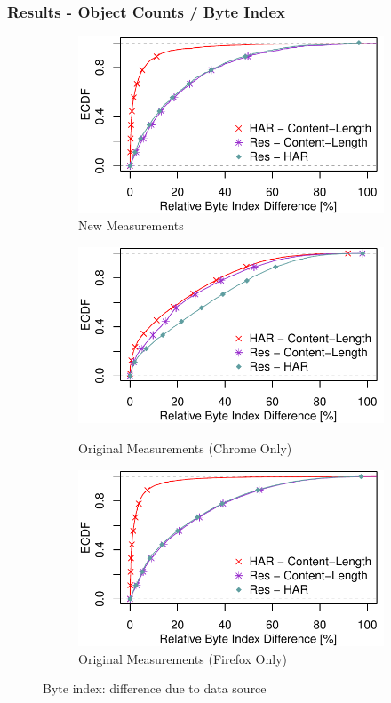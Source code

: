 \begin{frame}
    \frametitle{Results - Object Counts / Byte Index}
\begin{figure}
 \centering
 \begin{subfigure}{0.5\textwidth}
 \centering
 	 \includegraphics[width=\linewidth,keepaspectratio]{New_Plots/ecdf_rel_object_byte_index.pdf}
	\caption{New Measurements}
	\label{fig:new_relative_byte_index}

	\end{subfigure}%
	 \begin{subfigure}{0.5\textwidth}
	 \centering
	\includegraphics[width=.8\linewidth,keepaspectratio]{Chrome_Plots/ecdf_rel_object_byte_index.pdf}
	\caption{Original Measurements (Chrome Only)}
	\label{fig:orig_chrome_relative_byte_index}
	\par\medskip
	\includegraphics[width=.8\linewidth,keepaspectratio]{Firefox Plots/ecdf_rel_object_byte_index.pdf}
	\caption{Original Measurements (Firefox Only)}
	\label{fig:orig_firefox_relative_byte_index}
	\end{subfigure}
\caption{Byte index: difference due to data source}
\end{figure}

\end{frame}
